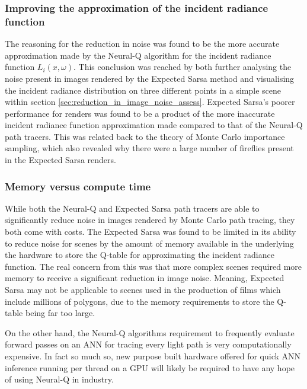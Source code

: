 \documentclass[../dissertation.tex]{subfiles}
\begin{document}
\subsubsection*{Improving the approximation of the incident radiance function}
The reasoning for the reduction in noise was found to be the more accurate approximation made by the Neural-Q algorithm for the incident radiance function $L_i(x, \omega)$. This conclusion was reached by both further analysing the noise present in images rendered by the Expected Sarsa method and visualising the incident radiance distribution on three different points in a simple scene within section \ref{sec:reduction_in_image_noise_assess}. Expected Sarsa's poorer performance for renders was found to be a product of the more inaccurate incident radiance function approximation made compared to that of the Neural-Q path tracers. This was related back to the theory of Monte Carlo importance sampling, which also revealed why there were a large number of fireflies present in the Expected Sarsa renders. 

\subsubsection*{Memory versus compute time}
While both the Neural-Q and Expected Sarsa path tracers are able to significantly reduce noise in images rendered by Monte Carlo path tracing, they both come with costs. The Expected Sarsa was found to be limited in its ability to reduce noise for scenes by the amount of memory available in the underlying the hardware to store the Q-table for approximating the incident radiance function. The real concern from this was that more complex scenes required more memory to receive a significant reduction in image noise. Meaning, Expected Sarsa may not be applicable to scenes used in the production of films which include millions of polygons, due to the memory requirements to store the Q-table being far too large.

On the other hand, the Neural-Q algorithms requirement to frequently evaluate forward passes on an ANN for tracing every light path is very computationally expensive. In fact so much so, new purpose built hardware offered for quick ANN inference running per thread on a GPU will likely be required to have any hope of using Neural-Q in industry.
\end{document}
